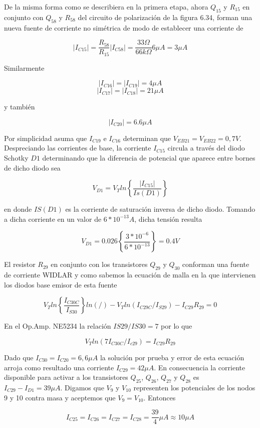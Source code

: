 \documentclass[12pt,a4paper,final,headinclude,footinclude,BCOR5mm]{scrartcl}
\begin{document}
De la misma forma como se describiera en la primera etapa, ahora $Q_{15}$ y $R_{15}$ en conjunto con $Q_{58}$ y $R_{58}$  del circuito de polarización de la figura 6.34, forman una nueva fuente de corriente no simétrica de modo de establecer una corriente de

$$|I_{C15}| = \dfrac{R_{58}}{R_{15}}|I_{C58}| = \dfrac{33 \Omega}{66 k\Omega}6 \mu A = 3 \mu A$$

Similarmente

$$|I_{C16}| = |I_{C19}| = 4 \mu A$$
$$|I_{C17}| = |I_{C18}| = 21 \mu A$$

y también

$$|I_{C20}| = 6.6 \mu A$$

Por simplicidad asuma que $I_{C19}$ e $I_{C16}$ determinan que $V_{EB21} = V_{EB22} = 0,7 V$. Despreciando las corrientes de base, la corriente $I_{C15}$ circula a través del diodo Schotky $D1$ determinando que la diferencia de potencial que aparece entre bornes de dicho diodo sea

$$V_{D1} = V_{T} ln \left \{ \frac{|I_{C15}|}{Is(D1)} \right \}$$

en donde $IS(D1)$ es la corriente de saturación inversa de dicho diodo. Tomando a dicha corriente en un valor de $6*10^{-13} A$, dicha tensión resulta

$$V_{D1} = 0.026 \left \{ \frac{3*10^{-6}}{6*10^{-13}} \right \} = 0.4 V$$

El resistor $R_{29}$ en conjunto con los transistores $Q_{29}$ y $Q_{30}$ conforman una fuente de corriente WIDLAR y como sabemos la ecuación de malla en la que intervienen los diodos base emisor de esta fuente

$$V_{T} ln \left \{ \frac{I_{C30C}}{I_{S30}} \right \}             ln(/)-V_{T} ln(I_{C29C}/I_{S29})-I_{C29}R_{29} = 0$$

En el Op.Amp. NE5234 la relación $IS29/IS30 = 7$ por lo que

$$V_{T} ln(7 I_{C30C}/I_{c29}) = I_{C29}R_{29}$$

Dado que $I_{C30} = I_{C20} = 6,6 \mu A$ la solución por prueba y error de esta ecuación arroja como resultado una corriente $I_{C29} =  42 \mu A$. En consecuencia la corriente disponible para activar a los transistores $Q_{25}$, $Q_{26}$, $Q_{27}$ y $Q_{28}$ es  $I_{C29} - I_{D1} =  39 \mu A$. Digamos que $V_{9}$ y $V_{10}$ representen los potenciales de los nodos 9 y 10 contra masa y aceptemos que $V_{9} = V_{10}$. Entonces

$$I_{C25} = I_{C26} = I_{C27} = I_{C28} = \dfrac{39}{4} \mu A \approx 10 \mu A$$
\end{document}
